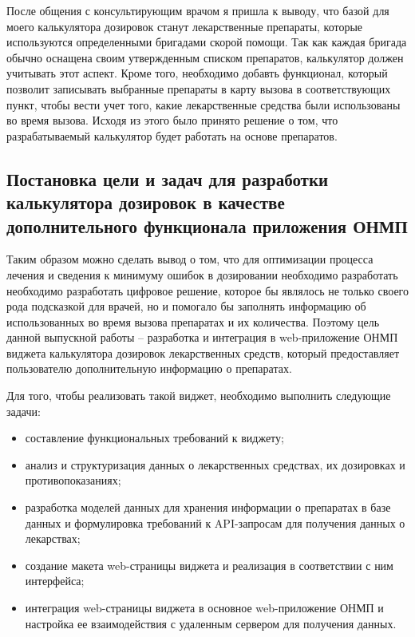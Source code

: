 После общения с консультирующим врачом я пришла к выводу, что базой для моего калькулятора дозировок станут лекарственные препараты, которые используются определенными бригадами скорой помощи. Так как каждая бригада обычно оснащена своим утвержденным списком препаратов, калькулятор должен учитывать этот аспект. Кроме того, необходимо добавть функционал, который позволит записывать выбранные препараты в карту вызова в соответствующих пункт, чтобы вести учет того, какие лекарственные средства были использованы во время вызова. Исходя из этого было принято решение о том, что разрабатываемый калькулятор будет работать на основе препаратов.

\subsection{Постановка цели и задач для разработки калькулятора дозировок в качестве дополнительного функционала приложения ОНМП}

Таким образом можно сделать вывод о том,  что для оптимизации процесса лечения и сведения к минимуму ошибок в дозировании необходимо разработать необходимо разработать цифровое решение, которое бы являлось не только своего рода подсказкой для врачей, но и помогало бы заполнять информацию об использованных во время вызова препаратах и их количества. Поэтому цель данной выпускной работы -- разработка и интеграция в web-приложение ОНМП виджета калькулятора дозировок лекарственных средств, который предоставляет пользователю дополнительную информацию о препаратах.  

Для того, чтобы реализовать такой виджет, необходимо выполнить следующие задачи:
\begin{itemize}

\item составление функциональных требований к виджету;

\item анализ и структуризация данных о лекарственных средствах, их дозировках и противопоказаниях;

\item разработка моделей данных для хранения информации о препаратах в базе данных и формулировка требований к API-запросам для получения данных о лекарствах;

\item создание макета web-страницы виджета и реализация в соответствии с ним интерфейса;

\item интеграция web-страницы виджета в основное web-приложение ОНМП и настройка ее взаимодействия  с удаленным сервером для получения данных.
\end{itemize}

